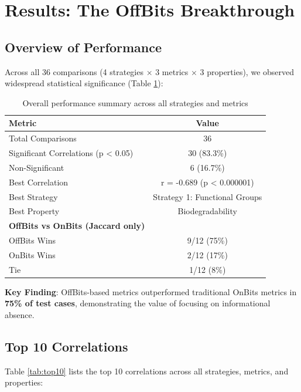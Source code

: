 \documentclass[11pt,letterpaper]{article}
\begin{document}
\section{Results: The OffBits Breakthrough}

\subsection{Overview of Performance}

Across all 36 comparisons (4 strategies $\times$ 3 metrics $\times$ 3 properties), we observed widespread statistical significance (Table \ref{tab:overall_performance}):

\begin{table}[H]
\centering
\caption{Overall performance summary across all strategies and metrics}
\label{tab:overall_performance}
\begin{tabular}{lc}
\toprule
\textbf{Metric} & \textbf{Value} \\
\midrule
Total Comparisons & 36 \\
Significant Correlations (p < 0.05) & 30 (83.3\%) \\
Non-Significant & 6 (16.7\%) \\
Best Correlation & r = -0.689 (p < 0.000001) \\
Best Strategy & Strategy 1: Functional Groups \\
Best Property & Biodegradability \\
\midrule
\textbf{OffBits vs OnBits (Jaccard only)} & \\
OffBits Wins & 9/12 (75\%) \\
OnBits Wins & 2/12 (17\%) \\
Tie & 1/12 (8\%) \\
\bottomrule
\end{tabular}
\end{table}

\textbf{Key Finding}: OffBits-based metrics outperformed traditional OnBits metrics in \textbf{75\% of test cases}, demonstrating the value of focusing on informational absence.

\subsection{Top 10 Correlations}

Table \ref{tab:top10} lists the top 10 correlations across all strategies, metrics, and properties:
\end{document}
